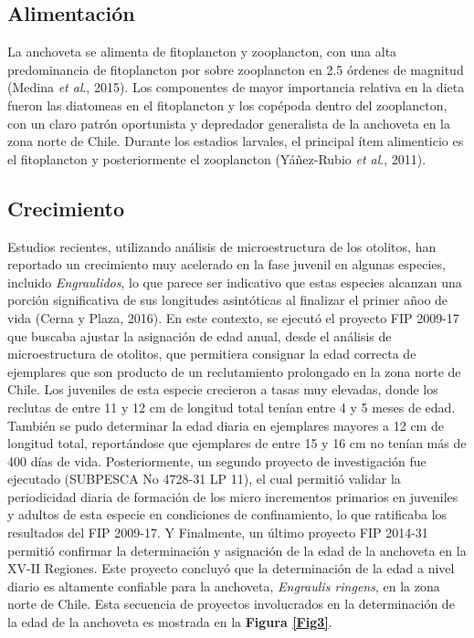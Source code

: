\documentclass[letter,11pt]{article}
\begin{document}
\subsection{Alimentaci\'on}

La anchoveta se alimenta de fitoplancton y zooplancton, con una alta
predominancia de fitoplancton por sobre zooplancton en 2.5 \'ordenes de
magnitud (Medina \textit{et al}., 2015). Los componentes de mayor
importancia relativa en la dieta fueron las diatomeas en el fitoplancton
y los cop\'epoda dentro del zooplancton, con un claro patr\'on oportunista y
depredador generalista de la anchoveta en la zona norte de Chile.
Durante los estadios larvales, el principal \'item alimenticio es el
fitoplancton y posteriormente el zooplancton (Y\'a\~{n}ez-Rubio
\textit{et al}., 2011).


\subsection{Crecimiento}

Estudios recientes, utilizando an\'alisis de microestructura de los
otolitos, han reportado un crecimiento muy acelerado en la fase juvenil
en algunas especies, incluido \textit{Engraulidos}, lo que parece ser
indicativo que estas especies alcanzan una porci\'on significativa de sus
longitudes asint\'oticas al finalizar el primer a\~{n}oo de vida (Cerna y
Plaza, 2016). En este contexto, se ejecut\'o el proyecto FIP 2009-17 que
buscaba ajustar la asignaci\'on de edad anual, desde el an\'alisis de
microestructura de otolitos, que permitiera consignar la edad correcta
de ejemplares que son producto de un reclutamiento prolongado en la zona
norte de Chile. Los juveniles de esta especie crecieron a tasas muy
elevadas, donde los reclutas de entre 11 y 12 cm de longitud total
ten\'ian entre 4 y 5 meses de edad. Tambi\'en se pudo determinar la edad
diaria en ejemplares mayores a 12 cm de longitud total, report\'andose que
ejemplares de entre 15 y 16 cm no ten\'ian m\'as de 400 d\'ias de vida.
Posteriormente, un segundo proyecto de investigaci\'on fue ejecutado
(SUBPESCA No 4728-31 LP 11), el cual permiti\'o validar la periodicidad
diaria de formaci\'on de los micro incrementos primarios en juveniles y
adultos de esta especie en condiciones de confinamiento, lo que
ratificaba los resultados del FIP 2009-17. Y Finalmente, un \'ultimo
proyecto FIP 2014-31 permiti\'o confirmar la determinaci\'on y asignaci\'on de
la edad de la anchoveta en la XV-II Regiones. Este proyecto concluy\'o que
la determinaci\'on de la edad a nivel diario es altamente confiable para
la anchoveta, \textit{Engraulis ringens}, en la zona norte de Chile.
Esta secuencia de proyectos involucrados en la determinaci\'on de la edad
de la anchoveta es mostrada en la \textbf{Figura \ref{Fig3}}.
\end{document}

